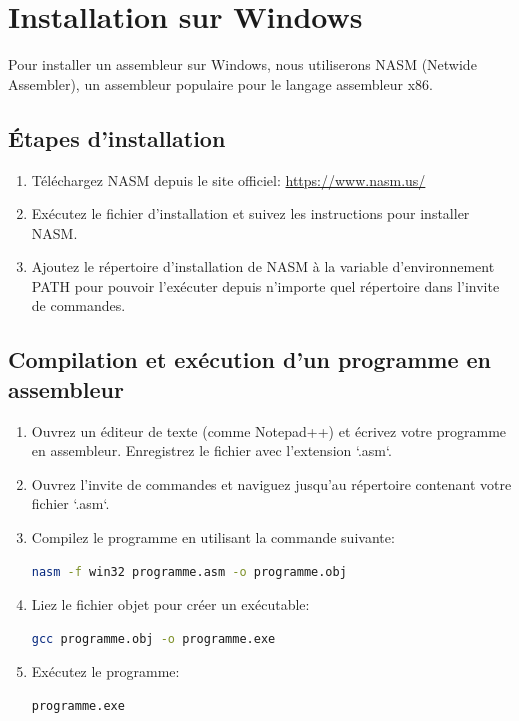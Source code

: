 \documentclass[a4paper, 12pt]{report}
\begin{document}
\section{Installation sur Windows}
Pour installer un assembleur sur Windows, nous utiliserons NASM (Netwide Assembler), un assembleur populaire pour le langage assembleur x86.

\subsection{Étapes d'installation}
\begin{enumerate}
  \item Téléchargez NASM depuis le site officiel: \url{https://www.nasm.us/}
  \item Exécutez le fichier d'installation et suivez les instructions pour installer NASM.
  \item Ajoutez le répertoire d'installation de NASM à la variable d'environnement PATH pour pouvoir l'exécuter depuis n'importe quel répertoire dans l'invite de commandes.
\end{enumerate}

\subsection{Compilation et exécution d'un programme en assembleur}
\begin{enumerate}
  \item Ouvrez un éditeur de texte (comme Notepad++) et écrivez votre programme en assembleur. Enregistrez le fichier avec l'extension `.asm`.
  \item Ouvrez l'invite de commandes et naviguez jusqu'au répertoire contenant votre fichier `.asm`.
  \item Compilez le programme en utilisant la commande suivante:
  \begin{lstlisting}[language=bash]
  nasm -f win32 programme.asm -o programme.obj
  \end{lstlisting}
  \item Liez le fichier objet pour créer un exécutable:
  \begin{lstlisting}[language=bash]
  gcc programme.obj -o programme.exe
  \end{lstlisting}
  \item Exécutez le programme:
  \begin{lstlisting}[language=bash]
  programme.exe
  \end{lstlisting}
\end{enumerate}
\end{document}
